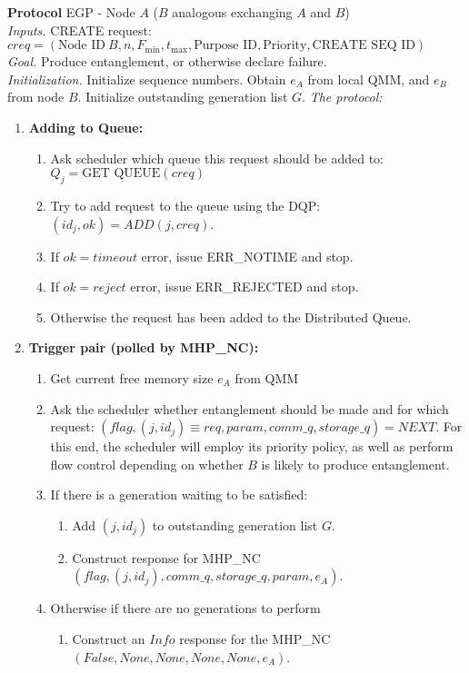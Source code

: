 \documentclass{article}
\makeatletter
\newcounter{Lprotocol}
\newenvironment{Lprotocol}[1]
  {\par\addvspace{\topsep}
   \noindent
   \tabularx{\linewidth}{@{} X @{}}
    \hline
    \refstepcounter{Lprotocol}\textbf{Protocol \theLprotocol} #1 \\
    \hline}
  { \\
    \hline
   \endtabularx
   \par\addvspace{\topsep}}
\newcommand{\sbline}{\\[.5\normalbaselineskip]}%
\makeatother
\begin{document}
\begin{Lprotocol}{EGP - Node $A$ ($B$ analogous exchanging $A$ and $B$)}
\textit{Inputs.} CREATE request: $creq = (\mbox{Node ID}\ B, n, F_{\min}, t_{\max}, \mbox{Purpose ID}, \mbox{Priority}, \mbox{CREATE SEQ ID})$
\sbline
\textit{Goal.} Produce entanglement, or otherwise declare failure.
\sbline
\textit{Initialization.} Initialize sequence numbers. Obtain $e_A$ from local QMM, and $e_B$ from node $B$. Initialize
outstanding generation list $G$.
\textit{The protocol:}
\begin{enumerate}
  \item \textbf{Adding to Queue:}
  \begin{enumerate}
    \item Ask scheduler which queue this request should be added to: $Q_j = \mbox{GET QUEUE}(creq)$
    \item Try to add request to the queue using the DQP: $(id_j, ok) = ADD(j, creq)$.
    \item If $ok = timeout$ error, issue ERR\_NOTIME and stop.
    \item If $ok = reject$ error, issue ERR\_REJECTED and stop.
    \item Otherwise the request has been added to the Distributed Queue.
   \end{enumerate}
  \item \textbf{Trigger pair (polled by MHP\_NC):}
  \begin{enumerate}
    \item Get current free memory size $e_A$ from QMM
	\item Ask the scheduler whether entanglement should be made and for which request: $(flag, (j,id_j) \equiv req, param, comm\_q, storage\_q) = NEXT$. For this end, the scheduler will employ its priority policy, as well as perform flow control depending on whether $B$ is likely to produce entanglement.
    \item If there is a generation waiting to be satisfied:
    \begin{enumerate}
	  \item Add $(j,id_j)$ to outstanding generation list $G$.
      \item Construct response for MHP\_NC $(flag, (j,id_j), comm\_q, storage\_q, param, e_A)$.
    \end{enumerate}
    \item Otherwise if there are no generations to perform
	\begin{enumerate}
	  \item Construct an $Info$ response for the MHP\_NC $(False, None, None, None, None, e_A)$.

\end{enumerate}
\end{enumerate}
\end{enumerate}
\end{Lprotocol}
\end{document}
